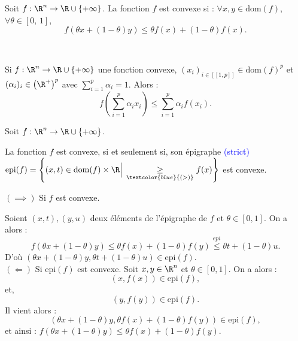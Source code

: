 \documentclass[12pt,a4paper]{article}
\begin{document}
	Soit $f : \R^n \to \R\cup\{+\infty\}$. La fonction $f$ est convexe si : $\forall x,y \in \mathrm{dom}(f)$, $\forall \theta \in [0,\,1]$, 
	\[f(\theta x+(1-\theta)y) \leq \theta f(x)+(1-\theta)f(x).\]
	
	\begin{lm}
		$ $\\
		\begin{minipage}{18cm}
			Si $f : \R^n \to \R \cup\{+\infty\}$ une fonction convexe, $(x_i)_{i \in [\![1,p]\!]}\in \mathrm{dom}(f)^p$ et $(\alpha_i)_i \in  \left(\R^+\right)^p$ avec $\displaystyle\sum_{i=1}^p\alpha_i = 1$. Alors :
			\[
				f\left(\sum_{i=1}^p\alpha_i x_i\right) \leq \sum_{i=1}^p \alpha_i f(x_i).
			\]
		\end{minipage}
	\end{lm}
	
	\begin{thm}
		Soit $f : \R^n \to \R \cup\{+\infty\}$. 
		
		\begin{minipage}{15cm}
			La fonction $f$ est convexe, si et seulement si, son épigraphe \textcolor{blue}{(strict)}\\ $\mathrm{epi}(f) = \left\{(x,t)\in \mathrm{dom}(f)\times\R\Big|\,\underset{\textcolor{blue}{(>)}}{\geq} f(x)\right\}$ est convexe.
		\end{minipage}
	\end{thm}
	\begin{dem}
		$(\implies)$ Si $f$ est convexe.\
		
		\begin{minipage}{17cm}
		Soient $(x,t),(y,u)$ deux éléments de l'épigraphe de $f$ et $\theta \in [0,1]$. On a alors :
		\begin{equation}
			f(\theta x + (1-\theta) y) \leq \theta f(x) + (1-\theta)f(y) \overset{epi}{\leq} \theta t + (1-\theta) u.
		\end{equation}
		D'où $\left(\theta x + (1-\theta)y,\theta t+(1-\theta) u\right) \in \mathrm{epi}(f)$.\\
		
		$(\Longleftarrow)$ Si $\mathrm{epi}(f)$ est convexe. Soit $x,y \in \R^n$ et $\theta \in [0,1]$. On a alors :
		\[
			(x,f(x)) \in \mathrm{epi}(f),
		\]
		et,
		\[
			(y,f(y)) \in \mathrm{epi}(f).
		\]
		Il vient alors :
		\[
			(\theta x + (1-\theta)y,\theta f(x) + (1-\theta) f(y) ) \in \mathrm{epi}(f),
		\]
		et ainsi : $f(\theta x + (1-\theta) y) \leq \theta f(x) + (1-\theta) f(y)$.
		\end{minipage}
	\end{dem}
	
\end{document}
